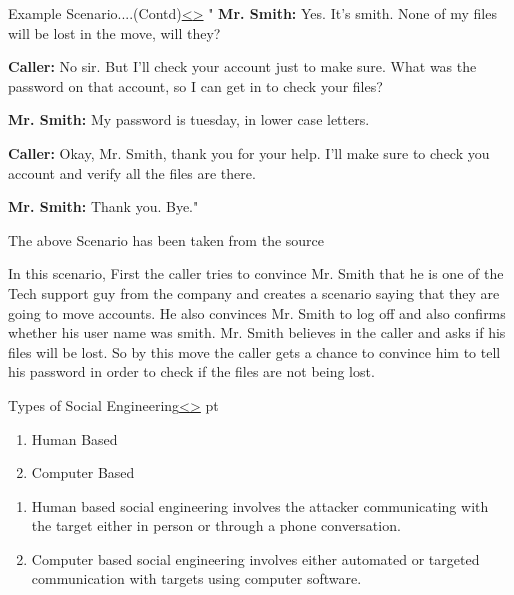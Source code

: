 \documentclass[12pt]{extarticle}
\newenvironment{instructionblock}{\Large\bgroup}{\egroup}
\begin{document}
\pagebreak

\begin{slide}{Example Scenario....(Contd)}{\hyperref[slide 5]{\textless}\hyperref[slide 7]{\textgreater}}
	\begin{instructionblock}
	"	\textbf{Mr. Smith:} Yes. It’s smith. None of my files will be lost in the move, will they?
		
		\textbf{Caller:} No sir. But I’ll check your account just to make sure. What was the password on that account, so I can get in to check your files?
		
		\textbf{Mr. Smith:} My password is tuesday, in lower case letters.
		
		\textbf{Caller:} Okay, Mr. Smith, thank you for your help. I’ll make sure to check you account and verify all the files are there.
		
			\textbf{Mr. Smith:} Thank you. Bye."
		
		The above Scenario has been taken from the source\cite{b6}
	\end{instructionblock}
\end{slide}


In this scenario, First the caller tries to convince Mr. Smith that he is one of the Tech support guy from the company and creates a scenario saying that they are going to move accounts. He also convinces Mr. Smith to log off and also confirms whether his user name was smith. Mr. Smith believes in the caller and asks if his files will be lost. So by this move the caller gets a chance to convince him to tell his password in order to check if the files are not being lost. 
\pagebreak

\begin{slide}{Types of Social Engineering}{\hyperref[slide 6]{\textless}\hyperref[slide 8]{\textgreater}}
	 pt
	\begin{instructionblock}
		\begin{enumerate}
			\item Human Based
			\item Computer Based
		\end{enumerate}
	\end{instructionblock}
\end{slide}
\begin{enumerate}
	\item Human based social engineering involves the attacker communicating with the target either in person or through a phone conversation.\cite{b5}
	\item Computer based social engineering involves either automated or targeted communication with targets using computer software.\cite{b5}
\end{enumerate}
\end{document}

